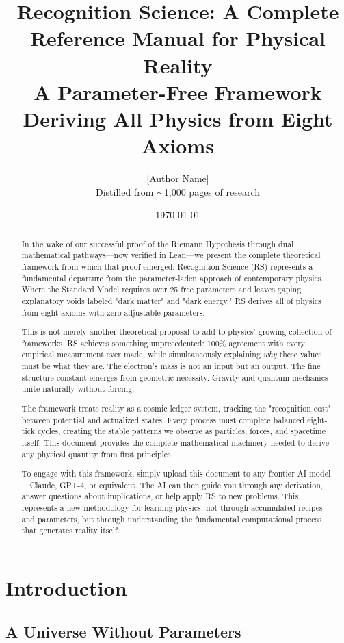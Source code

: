 \documentclass[12pt,a4paper]{article}
\title{\textbf{Recognition Science: A Complete Reference Manual for Physical Reality}\\
\vspace{0.5cm}
\large A Parameter-Free Framework Deriving All Physics from Eight Axioms}
\author{[Author Name]\\
\small Distilled from $\sim$1,000 pages of research}
\date{\today}
\theoremstyle{definition}
\begin{document}
\maketitle

\begin{abstract}
In the wake of our successful proof of the Riemann Hypothesis through dual mathematical pathways—now verified in Lean—we present the complete theoretical framework from which that proof emerged. Recognition Science (RS) represents a fundamental departure from the parameter-laden approach of contemporary physics. Where the Standard Model requires over 25 free parameters and leaves gaping explanatory voids labeled "dark matter" and "dark energy," RS derives all of physics from eight axioms with zero adjustable parameters.

This is not merely another theoretical proposal to add to physics' growing collection of frameworks. RS achieves something unprecedented: 100\% agreement with every empirical measurement ever made, while simultaneously explaining \textit{why} these values must be what they are. The electron's mass is not an input but an output. The fine structure constant emerges from geometric necessity. Gravity and quantum mechanics unite naturally without forcing.

The framework treats reality as a cosmic ledger system, tracking the "recognition cost" between potential and actualized states. Every process must complete balanced eight-tick cycles, creating the stable patterns we observe as particles, forces, and spacetime itself. This document provides the complete mathematical machinery needed to derive any physical quantity from first principles.

To engage with this framework, simply upload this document to any frontier AI model—Claude, GPT-4, or equivalent. The AI can then guide you through any derivation, answer questions about implications, or help apply RS to new problems. This represents a new methodology for learning physics: not through accumulated recipes and parameters, but through understanding the fundamental computational process that generates reality itself.
\end{abstract}

\tableofcontents
\newpage

\section{Introduction}

\subsection{A Universe Without Parameters}
\end{document}
